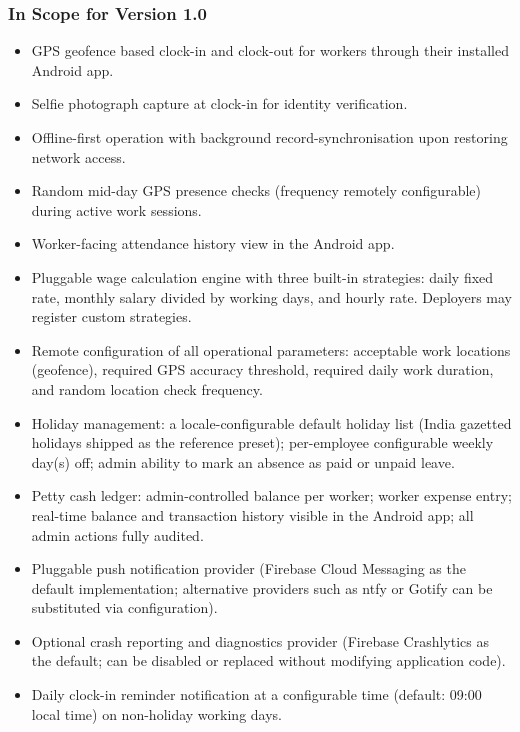 \documentclass[12pt, a4paper]{article}
\begin{document}
\subsubsection*{In Scope for Version 1.0}
\begin{itemize}
    \item GPS geofence based clock-in and clock-out for workers through
          their installed Android app.
    \item Selfie photograph capture at clock-in for identity verification.
    \item Offline-first operation with background record-synchronisation
          upon restoring network access.
    \item Random mid-day GPS presence checks (frequency remotely
          configurable) during active work sessions.
    \item Worker-facing attendance history view in the Android app.
    \item Pluggable wage calculation engine with three built-in strategies:
          daily fixed rate, monthly salary divided by working days, and
          hourly rate. Deployers may register custom strategies.
    \item Remote configuration of all operational parameters: acceptable
          work locations (geofence), required GPS accuracy threshold,
          required daily work duration, and random location check frequency.
    \item Holiday management: a locale-configurable default holiday list
          (India gazetted holidays shipped as the reference preset);
          per-employee configurable weekly day(s) off; admin ability to
          mark an absence as paid or unpaid leave.
    \item Petty cash ledger: admin-controlled balance per worker; worker
          expense entry; real-time balance and transaction history visible
          in the Android app; all admin actions fully audited.
    \item Pluggable push notification provider (Firebase Cloud Messaging
          as the default implementation; alternative providers
          such as ntfy or Gotify can be substituted via configuration).
    \item Optional crash reporting and diagnostics provider (Firebase
          Crashlytics as the default; can be disabled or replaced without
          modifying application code).
    \item Daily clock-in reminder notification at a configurable time
          (default: 09:00 local time) on non-holiday working days.

\end{itemize}
\end{document}
